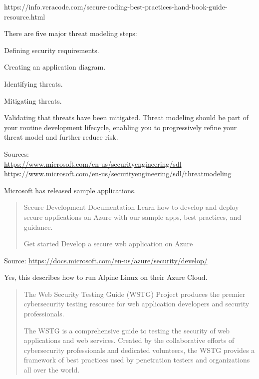 \documentclass[Screen16to9,17pt]{foils}
\begin{document}
{https://info.veracode.com/secure-coding-best-practices-hand-book-guide-resource.html}



There are five major threat modeling steps:
\begin{list2}
\item Defining security requirements.
\item Creating an application diagram.
\item Identifying threats.
\item Mitigating threats.
\item Validating that threats have been mitigated.
Threat modeling should be part of your routine development lifecycle, enabling you to progressively refine your threat model and further reduce risk.
\end{list2}

Sources:\\
\url{https://www.microsoft.com/en-us/securityengineering/sdl}\\
\url{https://www.microsoft.com/en-us/securityengineering/sdl/threatmodeling}



Microsoft has released sample applications.

\begin{quote}
Secure Development Documentation
Learn how to develop and deploy secure applications on Azure with our sample apps, best practices, and guidance.

Get started
Develop a secure web application on Azure
\end{quote}

Source:
\url{https://docs.microsoft.com/en-us/azure/security/develop/}

Yes, this describes how to run Alpine Linux on their Azure Cloud.



\begin{quote}
The Web Security Testing Guide (WSTG) Project produces the premier cybersecurity
testing resource for web application developers and security professionals.

The WSTG is a comprehensive guide to testing the security of web applications and
web services. Created by the collaborative efforts of cybersecurity professionals
and dedicated volunteers, the WSTG provides a framework of best practices used by
penetration testers and organizations all over the world.
\end{quote}
\end{document}

